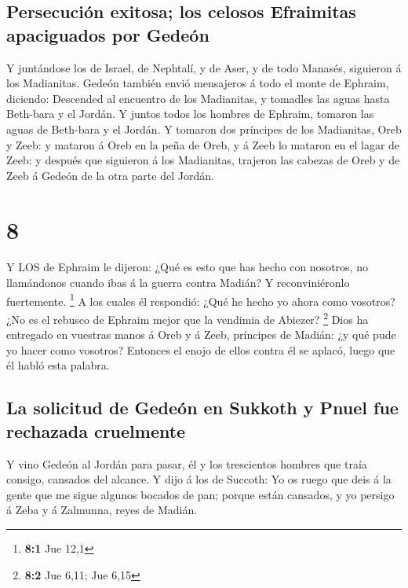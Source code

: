 \hypertarget{persecuciuxf3n-exitosa-los-celosos-efraimitas-apaciguados-por-gedeuxf3n}{%
\subsection{Persecución exitosa; los celosos Efraimitas apaciguados por
Gedeón}\label{persecuciuxf3n-exitosa-los-celosos-efraimitas-apaciguados-por-gedeuxf3n}}

 Y juntándose los de Israel, de Nephtalí, y de Aser, y de
todo Manasés, siguieron á los Madianitas.  Gedeón también
envió mensajeros á todo el monte de Ephraim, diciendo: Descended al
encuentro de los Madianitas, y tomadles las aguas hasta Beth-bara y el
Jordán. Y juntos todos los hombres de Ephraim, tomaron las aguas de
Beth-bara y el Jordán.  Y tomaron dos príncipes de los
Madianitas, Oreb y Zeeb: y mataron á Oreb en la peña de Oreb, y á Zeeb
lo mataron en el lagar de Zeeb: y después que siguieron á los
Madianitas, trajeron las cabezas de Oreb y de Zeeb á Gedeón de la otra
parte del Jordán.

\hypertarget{section-7}{%
\section{8}\label{section-7}}

 Y LOS de Ephraim le dijeron: ¿Qué es esto que has hecho con
nosotros, no llamándonos cuando ibas á la guerra contra Madián? Y
reconviniéronlo fuertemente. \footnote{\textbf{8:1} Jue 12,1}
 A los cuales él respondió: ¿Qué he hecho yo ahora como
vosotros? ¿No es el rebusco de Ephraim mejor que la vendimia de Abiezer?
\footnote{\textbf{8:2} Jue 6,11; Jue 6,15}  Dios ha
entregado en vuestras manos á Oreb y á Zeeb, príncipes de Madián: ¿y qué
pude yo hacer como vosotros? Entonces el enojo de ellos contra él se
aplacó, luego que él habló esta palabra.

\hypertarget{la-solicitud-de-gedeuxf3n-en-sukkoth-y-pnuel-fue-rechazada-cruelmente}{%
\subsection{La solicitud de Gedeón en Sukkoth y Pnuel fue rechazada
cruelmente}\label{la-solicitud-de-gedeuxf3n-en-sukkoth-y-pnuel-fue-rechazada-cruelmente}}

 Y vino Gedeón al Jordán para pasar, él y los trescientos
hombres que traía consigo, cansados del alcance.  Y dijo á
los de Succoth: Yo os ruego que deis á la gente que me sigue algunos
bocados de pan; porque están cansados, y yo persigo á Zeba y á Zalmunna,
reyes de Madián.

